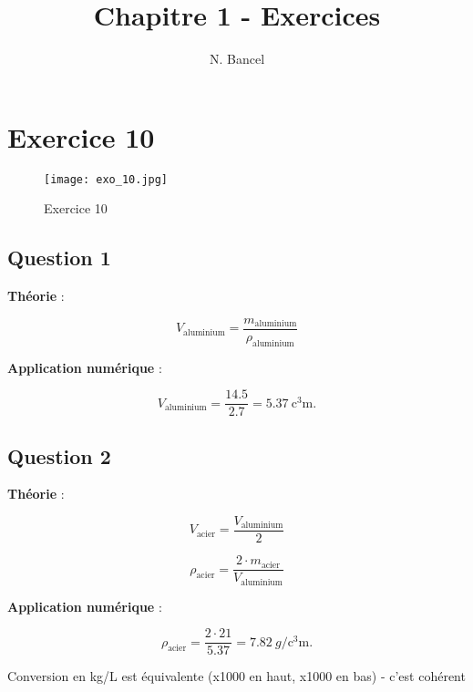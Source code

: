 \documentclass[a4paper,12pt]{article}
\begin{document}
\title{Chapitre 1 - Exercices}
\author{N. Bancel}

\maketitle

\section{Exercice 10}

\begin{figure}[H]
  \centering
  \texttt{[image: exo\_10.jpg]}
  \caption{\label{} Exercice 10}
\end{figure}


\subsection{Question 1}

\textbf{Théorie} : 

\[
V_{\text{aluminium}} = \frac{m_{\text{aluminium}}}{\rho_{\text{aluminium}}}
\]

\textbf{Application numérique} : 

\[
V_{\text{aluminium}} = \frac{14.5}{2.7} = \SI{5.37}{\cubic\centi\meter}.
\]

\subsection{Question 2}

\textbf{Théorie} : 

\[
V_{\text{acier}} = \frac{V_{\text{aluminium}}}{2}
\]

\[
\rho_{\text{acier}} = \frac{2 \cdot m_{\text{acier}}}{V_{\text{aluminium}}}
\]

\textbf{Application numérique} : 

\[
\rho_{\text{acier}} = \frac{2 \cdot 21}{5.37} = \SI{7.82}{g\per\cubic\centi\meter}.
\]

Conversion en kg/L est équivalente (x1000 en haut, x1000 en bas) - c'est cohérent
\end{document}
